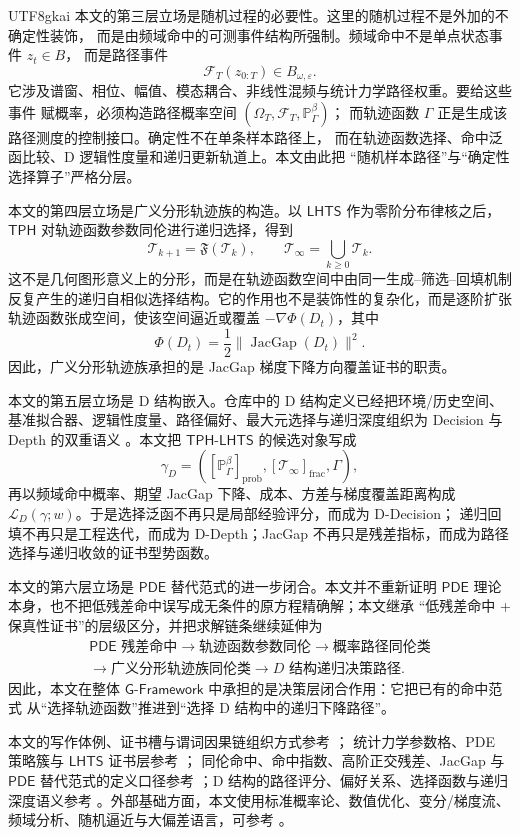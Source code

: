\documentclass[12pt]{article}
\newcommand{\GFramework}{\textsf{G-Framework}}
\newcommand{\LHTS}{\ensuremath{\mathsf{LHTS}}}
\newcommand{\TPH}{\ensuremath{\mathsf{TPH}}}
\newcommand{\TPHLHTS}{\ensuremath{\mathsf{TPH\mbox{-}LHTS}}}
\newcommand{\PDE}{\ensuremath{\mathsf{PDE}}}
\DeclareMathOperator{\JacGap}{JacGap}
\begin{document}
\begin{CJK*}{UTF8}{gkai}
本文的第三层立场是随机过程的必要性。这里的随机过程不是外加的不确定性装饰，
而是由频域命中的可测事件结构所强制。频域命中不是单点状态事件 \(z_t\in B\)，
而是路径事件
\[
\mathscr F_T(z_{0:T})\in B_{\omega,\varepsilon}.
\]
它涉及谱窗、相位、幅值、模态耦合、非线性混频与统计力学路径权重。要给这些事件
赋概率，必须构造路径概率空间 \((\Omega_T,\mathscr F_T,\mathbb P_\Gamma^\beta)\)；
而轨迹函数 \(\Gamma\) 正是生成该路径测度的控制接口。确定性不在单条样本路径上，
而在轨迹函数选择、命中泛函比较、D 逻辑性度量和递归更新轨道上。本文由此把
“随机样本路径”与“确定性选择算子”严格分层。

本文的第四层立场是广义分形轨迹族的构造。以 \(\LHTS\) 作为零阶分布律核之后，
\(\TPH\) 对轨迹函数参数同伦进行递归选择，得到
\[
\mathcal T_{k+1}=\mathfrak F(\mathcal T_k),
\qquad
\mathcal T_\infty=\bigcup_{k\ge0}\mathcal T_k.
\]
这不是几何图形意义上的分形，而是在轨迹函数空间中由同一生成--筛选--回填机制
反复产生的递归自相似选择结构。它的作用也不是装饰性的复杂化，而是逐阶扩张
轨迹函数张成空间，使该空间逼近或覆盖 \(-\nabla\Phi(D_t)\)，其中
\[
\Phi(D_t)=\frac12\|\JacGap(D_t)\|^2.
\]
因此，广义分形轨迹族承担的是 JacGap 梯度下降方向覆盖证书的职责。

本文的第五层立场是 D 结构嵌入。仓库中的 D 结构定义已经把环境/历史空间、
基准拟合器、逻辑性度量、路径偏好、最大元选择与递归深度组织为
Decision 与 Depth 的双重语义 \cite{RepoTex3DStructure}。本文把 \(\TPHLHTS\)
的候选对象写成
\[
\gamma_D
=
\left(
[\mathbb P_\Gamma^\beta]_{\mathrm{prob}},
[\mathcal T_\infty]_{\mathrm{frac}},
\Gamma
\right),
\]
再以频域命中概率、期望 JacGap 下降、成本、方差与梯度覆盖距离构成
\(\mathcal L_D(\gamma;w)\)。于是选择泛函不再只是局部经验评分，而成为 D-Decision；
递归回填不再只是工程迭代，而成为 D-Depth；JacGap 不再只是残差指标，而成为路径
选择与递归收敛的证书型势函数。

本文的第六层立场是 \(\PDE\) 替代范式的进一步闭合。本文并不重新证明
\(\PDE\) 理论本身，也不把低残差命中误写成无条件的原方程精确解；本文继承
“低残差命中 + 保真性证书”的层级区分，并把求解链条继续延伸为
\[
\begin{gathered}
\PDE\text{ 残差命中}
\to
\text{轨迹函数参数同伦}
\to
\text{概率路径同伦类}
\\
\to
\text{广义分形轨迹族同伦类}
\to
D\text{ 结构递归决策路径}.
\end{gathered}
\]
因此，本文在整体 \(\GFramework{}\) 中承担的是决策层闭合作用：它把已有的命中范式
从“选择轨迹函数”推进到“选择 D 结构中的递归下降路径”。

本文的写作体例、证书槽与谓词因果链组织方式参考 \cite{RepoTex37SemanticGauge}；
统计力学参数格、PDE 策略簇与 \(\LHTS\) 证书层参考
\cite{RepoTex53StrategyCluster,RepoTex56LHTS}；
同伦命中、命中指数、高阶正交残差、JacGap 与 \(\PDE\) 替代范式的定义口径参考
\cite{RepoTex55PDEParadigm}；D 结构的路径评分、偏好关系、选择函数与递归深度语义参考
\cite{RepoTex3DStructure}。外部基础方面，本文使用标准概率论、数值优化、变分/梯度流、
频域分析、随机逼近与大偏差语言，可参考
\cite{Billingsley1995Probability,NocedalWright2006Optimization,AmbrosioGigliSavare2008GradientFlows,Evans2010PDE,OppenheimSchafer2010DSP,Mallat2009Wavelet,KushnerYin2003StochasticApproximation,Borkar2008StochasticApproximation,Touchette2009LargeDeviations,FreidlinWentzell2012RandomPerturbations}。


\end{CJK*}
\end{document}
